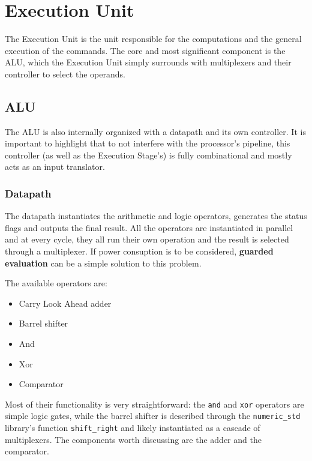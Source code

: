 \section{Execution Unit}
The Execution Unit is the unit responsible for the computations and the general execution of the commands.
The core and most significant component is the ALU, which the Execution Unit simply surrounds with multiplexers
and their controller to select the operands.

\subsection{ALU}
The ALU is also internally organized with a datapath and its own controller. It is important to highlight that to not
interfere with the processor's pipeline, this controller (as well as the Execution Stage's) is fully combinational and
mostly acts as an input translator.

\subsubsection{Datapath}
The datapath instantiates the arithmetic and logic operators, generates the status flags and outputs the final result.
All the operators are instantiated in parallel and at every cycle, they all run their own operation and the result
is selected through a multiplexer. If power consuption is to be considered, \textbf{guarded evaluation} can be a simple
solution to this problem.

The available operators are:
\begin{itemize}
    \item Carry Look Ahead adder
    \item Barrel shifter
    \item And
    \item Xor
    \item Comparator
\end{itemize}

Most of their functionality is very straightforward: the \texttt{and} and \texttt{xor} operators are simple logic gates,
while the barrel shifter is described through the \texttt{numeric\_std} library's function \texttt{shift\_right} and
likely instantiated as a cascade of multiplexers. The components worth discussing are the adder and the comparator.

